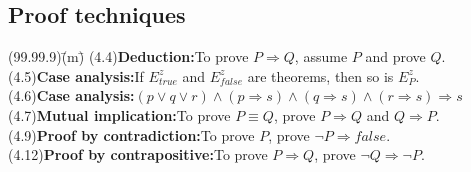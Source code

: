 \documentclass{amsart}
\newcommand{\lgap}{2pt}                             %
\newcommand{\impl}{\ensuremath{\Rightarrow}}        %
\begin{document}
\newpage

\subsection*{Proof techniques}
\begin{tabbing}
(99.99.9)\;\=(m)\;\=\kill
(4.4)\>\textbf{Deduction:}\quad To prove $P\impl Q$, assume $P$ and prove $Q$.\\[\lgap]
(4.5)\>\textbf{Case analysis:}\quad If $E^{z}_{true}$ and $E^{z}_{false}$ are theorems, then so is $E^{z}_{P}$.\\[\lgap]
(4.6)\>\textbf{Case analysis:}\quad $(p\lor q\lor r)\land (p\impl s)\land (q\impl s)\land (r\impl s)\impl s$\\[\lgap]
(4.7)\>\textbf{Mutual implication:}\quad To prove $P\equiv Q$, prove $P\impl Q$ and $Q\impl P$.\\[\lgap]
(4.9)\>\textbf{Proof by contradiction:}\quad To prove $P$, prove $\neg P\impl false$.\\[\lgap]
(4.12)\>\textbf{Proof by contrapositive:}\quad To prove $P\impl Q$, prove $\neg Q\impl \neg P$.\\
\end{tabbing}
\end{document}
